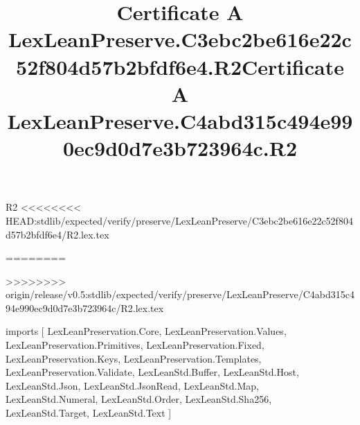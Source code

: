 \begin{lexlean}{R2}
<<<<<<<< HEAD:stdlib/expected/verify/preserve/LexLeanPreserve/C3ebc2be616e22c52f804d57b2bfdf6e4/R2.lex.tex
\title{Certificate A LexLeanPreserve.C3ebc2be616e22c52f804d57b2bfdf6e4.R2}
========
\title{Certificate A LexLeanPreserve.C4abd315c494e990ec9d0d7e3b723964c.R2}
>>>>>>>> origin/release/v0.5:stdlib/expected/verify/preserve/LexLeanPreserve/C4abd315c494e990ec9d0d7e3b723964c/R2.lex.tex
\begin{coremodule}
imports [
  LexLeanPreservation.Core,
  LexLeanPreservation.Values,
  LexLeanPreservation.Primitives,
  LexLeanPreservation.Fixed,
  LexLeanPreservation.Keys,
  LexLeanPreservation.Templates,
  LexLeanPreservation.Validate,
  LexLeanStd.Buffer,
  LexLeanStd.Host,
  LexLeanStd.Json,
  LexLeanStd.JsonRead,
  LexLeanStd.Map,
  LexLeanStd.Numeral,
  LexLeanStd.Order,
  LexLeanStd.Sha256,
  LexLeanStd.Target,
  LexLeanStd.Text
]


\end{coremodule}
\end{lexlean}
